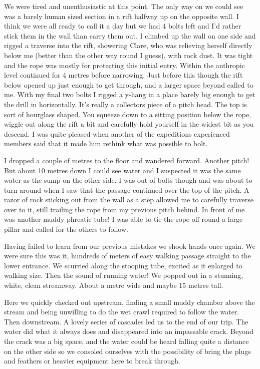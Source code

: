 We were tired and unenthusiastic at this point. The only way on we could see was a barely human sized section in a rift halfway up on the opposite wall. I think we were all ready to call it a day but we had 4 bolts left and I’d rather stick them in the wall than carry them out. I climbed up the wall on one side and rigged a traverse into the rift, showering Clare, who was relieving herself directly below me (better than the other way round I guess), with rock dust. It was tight and the rope was mostly for protecting this initial entry. Within the anthropic level continued for 4 metres before narrowing. Just before this though the rift below opened up just enough to get through, and a larger space beyond called to me. With my final two bolts I rigged a y-hang in a place barely big enough to get the drill in horizontally. It’s really a collectors piece of a pitch head. The top is sort of hourglass shaped. You squeeze down to a sitting position below the rope, wiggle out along the rift a bit and carefully hold yourself in the widest bit as you descend. I was quite pleased when another of the expeditions experienced members said that it made him rethink what was possible to bolt.


 
I dropped a couple of metres to the floor and wandered forward. Another pitch! But about 10 metres down I could see water and I suspected it was the same water as the sump on the other side. I was out of bolts though and was about to turn around when I saw that the passage continued over the top of the pitch. A razor of rock sticking out from the wall as a step allowed me to carefully traverse over to it, still trailing the rope from my previous pitch behind. In front of me was another muddy phreatic tube! I was able to tie the rope off round a large pillar and called for the others to follow.
 
Having failed to learn from our previous mistakes we shook hands once again. We were sure this was it, hundreds of meters of easy walking passage straight to the lower entrance. We scurried along the stooping tube, excited as it enlarged to walking size. Then the sound of running water! We popped out in a stunning, white, clean streamway. About a metre wide and maybe 15 metres tall.


 
Here we quickly checked out upstream, finding a small muddy chamber above the stream and being unwilling to do the wet crawl required to follow the water. Then downstream. A lovely series of cascades led us to the end of our trip. The water did what it always does and disappeared into an impassable crack. Beyond the crack was a big space, and the water could be heard falling quite a distance on the other side so we consoled ourselves with the possibility of bring the plugs and feathers or heavier equipment here to break through.
 
